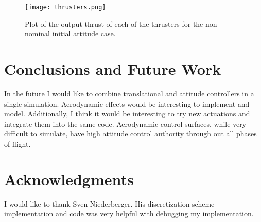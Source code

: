 \documentclass[conf]{new-aiaa}
\begin{document}
\begin{singlespace}
\begin{figure}[!htbp] 
  \centering
  \texttt{[image: thrusters.png]}
  \caption{Plot of the output thrust of each of the thrusters for the non-nominal initial attitude case.}
  \label{fig:thrusty}
 \end{figure}



\clearpage
\section{Conclusions and Future Work}
In the future I would like to combine translational and attitude controllers in a single simulation. Aerodynamic effects would be interesting to implement and model. Additionally, I think it would be interesting to try new actuations and integrate them into the same code. Aerodynamic control surfaces, while very difficult to simulate, have high attitude control authority through out all phases of flight.

\section{Acknowledgments}
I would like to thank Sven Niederberger. His discretization scheme implementation and code was very helpful with debugging my implementation. 


\end{singlespace}
\end{document}

